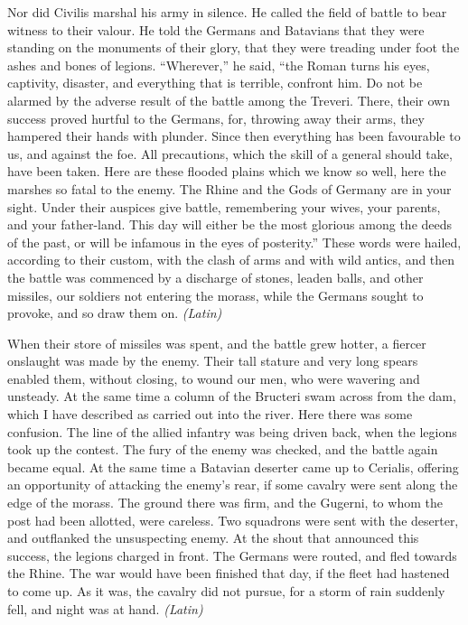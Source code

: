 
Nor did Civilis marshal his army in silence. He called the field of battle to bear witness to their valour. He told the Germans and Batavians that they were standing on the monuments of their glory, that they were treading under foot the ashes and bones of legions. ``Wherever,'' he said, ``the Roman turns his eyes, captivity, disaster, and everything that is terrible, confront him. Do not be alarmed by the adverse result of the battle among the Treveri. There, their own success proved hurtful to the Germans, for, throwing away their arms, they hampered their hands with plunder. Since then everything has been favourable to us, and against the foe. All precautions, which the skill of a general should take, have been taken. Here are these flooded plains which we know so well, here the marshes so fatal to the enemy. The Rhine and the Gods of Germany are in your sight. Under their auspices give battle, remembering your wives, your parents, and your father-land. This day will either be the most glorious among the deeds of the past, or will be infamous in the eyes of posterity.'' These words were hailed, according to their custom, with the clash of arms and with wild antics, and then the battle was commenced by a discharge of stones, leaden balls, and other missiles, our soldiers not entering the morass, while the Germans sought to provoke, and so draw them on. \emph{(Latin)}


When their store of missiles was spent, and the battle grew hotter, a fiercer onslaught was made by the enemy. Their tall stature and very long spears enabled them, without closing, to wound our men, who were wavering and unsteady. At the same time a column of the Bructeri swam across from the dam, which I have described as carried out into the river. Here there was some confusion. The line of the allied infantry was being driven back, when the legions took up the contest. The fury of the enemy was checked, and the battle again became equal. At the same time a Batavian deserter came up to Cerialis, offering an opportunity of attacking the enemy's rear, if some cavalry were sent along the edge of the morass. The ground there was firm, and the Gugerni, to whom the post had been allotted, were careless. Two squadrons were sent with the deserter, and outflanked the unsuspecting enemy. At the shout that announced this success, the legions charged in front. The Germans were routed, and fled towards the Rhine. The war would have been finished that day, if the fleet had hastened to come up. As it was, the cavalry did not pursue, for a storm of rain suddenly fell, and night was at hand. \emph{(Latin)}

